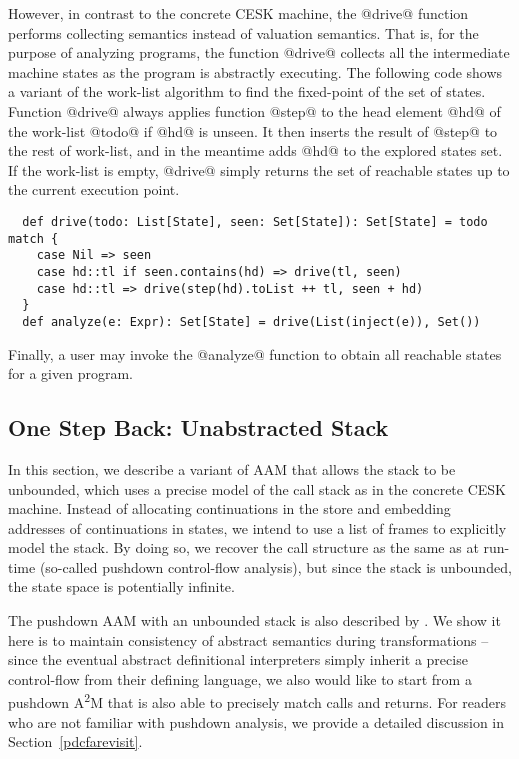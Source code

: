 \documentclass[acmsmall, screen]{acmart}\settopmatter{}
\begin{document}
However, in contrast to the concrete CESK machine, the @drive@ function performs
collecting semantics instead of valuation semantics. That is, for the purpose of
analyzing programs, the function @drive@ collects all the intermediate machine states
as the program is abstractly executing. The following code shows a variant of the
work-list algorithm to find the fixed-point of the set of states.
Function @drive@ always applies function @step@ to the head element @hd@ of
the work-list @todo@ if @hd@ is unseen. It then inserts the result of @step@ to
the rest of work-list, and in the meantime adds @hd@ to the explored states set.
If the work-list is empty, @drive@ simply returns the set of reachable states
up to the current execution point.

\begin{lstlisting}
  def drive(todo: List[State], seen: Set[State]): Set[State] = todo match {
    case Nil => seen
    case hd::tl if seen.contains(hd) => drive(tl, seen)
    case hd::tl => drive(step(hd).toList ++ tl, seen + hd)
  }
  def analyze(e: Expr): Set[State] = drive(List(inject(e)), Set())
\end{lstlisting}

Finally, a user may invoke the @analyze@ function to obtain all reachable states for
a given program.


\subsection{One Step Back: Unabstracted Stack} \label{unabs}

In this section, we describe a variant of AAM that allows the stack to be unbounded,
which uses a precise model of the call stack as in the concrete CESK machine.
Instead of allocating continuations in the store and embedding addresses of
continuations in states, we intend to use a list of frames to explicitly model
the stack. By doing so, we recover the call structure as the same as at run-time
(so-called pushdown control-flow analysis), but since the stack is unbounded,
the state space is potentially infinite.

The pushdown AAM with an unbounded stack is also described by \citeauthor{van2012systematic}
\cite{van2012systematic}.
We show it here is to maintain consistency of abstract semantics during
transformations -- since the eventual abstract definitional interpreters simply inherit
a precise control-flow from their defining language, we also would like to start from a
pushdown A\textsuperscript{2}M that is also able to precisely match calls and returns.
For readers who are not familiar with pushdown analysis, we provide a detailed discussion
in Section~\ref{pdcfarevisit}.
\end{document}
